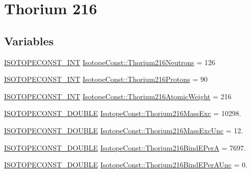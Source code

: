 \hypertarget{group___isotope_const-_thorium-_th216}{}\section{Thorium 216}
\label{group___isotope_const-_thorium-_th216}
\subsection*{Variables}
\begin{DoxyCompactItemize}
\item 
\mbox{\hyperlink{group___isotope_const-_macros_ga5f18360b3e99483a35c32d789e62621c}{I\+S\+O\+T\+O\+P\+E\+C\+O\+N\+S\+T\+\_\+\+I\+NT}} \mbox{\hyperlink{group___isotope_const-_thorium-_th216_ga9f177d1864bde951a6b307502ba7cf6e}{Isotope\+Const\+::\+Thorium216\+Neutrons}} = 126
\item 
\mbox{\hyperlink{group___isotope_const-_macros_ga5f18360b3e99483a35c32d789e62621c}{I\+S\+O\+T\+O\+P\+E\+C\+O\+N\+S\+T\+\_\+\+I\+NT}} \mbox{\hyperlink{group___isotope_const-_thorium-_th216_ga92b3222bb9c561d605f95e0b7e12bfd7}{Isotope\+Const\+::\+Thorium216\+Protons}} = 90
\item 
\mbox{\hyperlink{group___isotope_const-_macros_ga5f18360b3e99483a35c32d789e62621c}{I\+S\+O\+T\+O\+P\+E\+C\+O\+N\+S\+T\+\_\+\+I\+NT}} \mbox{\hyperlink{group___isotope_const-_thorium-_th216_gacda89ab72abac844a42eb2b8e8cb66b4}{Isotope\+Const\+::\+Thorium216\+Atomic\+Weight}} = 216
\item 
\mbox{\hyperlink{group___isotope_const-_macros_ga8f45a7272ce02c0b4c65c44636ed719a}{I\+S\+O\+T\+O\+P\+E\+C\+O\+N\+S\+T\+\_\+\+D\+O\+U\+B\+LE}} \mbox{\hyperlink{group___isotope_const-_thorium-_th216_ga9fcbfd64c1c3fb87e05b484c167f5d97}{Isotope\+Const\+::\+Thorium216\+Mass\+Exc}} = 10298.
\item 
\mbox{\hyperlink{group___isotope_const-_macros_ga8f45a7272ce02c0b4c65c44636ed719a}{I\+S\+O\+T\+O\+P\+E\+C\+O\+N\+S\+T\+\_\+\+D\+O\+U\+B\+LE}} \mbox{\hyperlink{group___isotope_const-_thorium-_th216_ga45f663ae810e33307dda4651bd249501}{Isotope\+Const\+::\+Thorium216\+Mass\+Exc\+Unc}} = 12.
\item 
\mbox{\hyperlink{group___isotope_const-_macros_ga8f45a7272ce02c0b4c65c44636ed719a}{I\+S\+O\+T\+O\+P\+E\+C\+O\+N\+S\+T\+\_\+\+D\+O\+U\+B\+LE}} \mbox{\hyperlink{group___isotope_const-_thorium-_th216_gae066a44ab8c755cfd3cf72cc94b4009b}{Isotope\+Const\+::\+Thorium216\+Bind\+E\+PerA}} = 7697.
\item 
\mbox{\hyperlink{group___isotope_const-_macros_ga8f45a7272ce02c0b4c65c44636ed719a}{I\+S\+O\+T\+O\+P\+E\+C\+O\+N\+S\+T\+\_\+\+D\+O\+U\+B\+LE}} \mbox{\hyperlink{group___isotope_const-_thorium-_th216_gacc359475d3c9b3b7b4eaeb1e7c3aa847}{Isotope\+Const\+::\+Thorium216\+Bind\+E\+Per\+A\+Unc}} = 0.

\end{DoxyCompactItemize}
